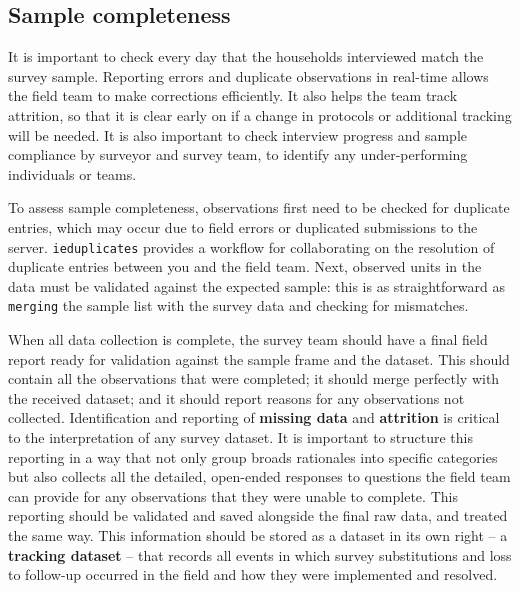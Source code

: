 {\subsection{Sample completeness}
It is important to check every day that the households interviewed match the survey sample. Reporting errors and duplicate observations in real-time allows the field team to make corrections efficiently.
It also helps the team track attrition, so that it is clear early on if a change in protocols or additional tracking will be needed. It is also important to check interview progress and sample compliance by surveyor and survey team, to identify any under-performing individuals or teams. 

To assess sample completeness, observations first need to be checked for duplicate entries, which may occur due to field errors or duplicated submissions to the server. 
\texttt{ieduplicates}
provides a workflow for collaborating on the resolution of duplicate entries between you and the field team.
Next, observed units in the data must be validated against the expected sample:
this is as straightforward as \texttt{merging} the sample list with the survey data and checking for mismatches.

When all data collection is complete, the survey team should have a final field report ready for validation against the sample frame and the dataset.
This should contain all the observations that were completed; it should merge perfectly with the received dataset; and it should report reasons for any observations not collected.
Identification and reporting of \textbf{missing data} and \textbf{attrition} is critical to the interpretation of any survey dataset.
It is important to structure this reporting in a way that not only group broads rationales into specific categories
but also collects all the detailed, open-ended responses to questions the field team can provide for any observations that they were unable to complete.
This reporting should be validated and saved alongside the final raw data, and treated the same way.
This information should be stored as a dataset in its own right -- a \textbf{tracking dataset} -- that records all events in which survey substitutions
and loss to follow-up occurred in the field and how they were implemented and resolved.


}
